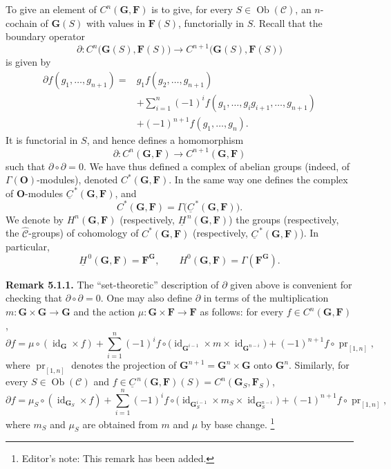 To give an element of \(C^n(\mathbf G,\mathbf F)\) is to give, for every
\(S\in\operatorname{Ob}(\mathscr C)\), an \(n\)-cochain of
\(\mathbf G(S)\) with values in \(\mathbf F(S)\), functorially in \(S\).
Recall that the boundary operator
\[
  \partial:C^n\bigl(\mathbf G(S),\mathbf F(S)\bigr)
    \longrightarrow
    C^{n+1}\bigl(\mathbf G(S),\mathbf F(S)\bigr)
\]
is given by
\begin{align*}
  \partial f(g_1,\ldots,g_{n+1})
    ={}&g_1f(g_2,\ldots,g_{n+1}) \\
     &+\sum_{i=1}^{n}(-1)^i
       f(g_1,\ldots,g_i g_{i+1},\ldots,g_{n+1}) \\
     &+(-1)^{n+1}f(g_1,\ldots,g_n).
\end{align*}
It is functorial in \(S\), and hence defines a homomorphism
\[
  \partial:C^n(\mathbf G,\mathbf F)
    \longrightarrow C^{n+1}(\mathbf G,\mathbf F)
\]
such that \(\partial\circ\partial=0\). We have thus defined a complex of
abelian groups (indeed, of \(\Gamma(\mathbf O)\)-modules), denoted
\(C^*(\mathbf G,\mathbf F)\). In the same way one defines the complex of
\(\mathbf O\)-modules \(\underline C^{\,*}(\mathbf G,\mathbf F)\), and
\[
  C^*(\mathbf G,\mathbf F)
    =\Gamma\bigl(\underline C^{\,*}(\mathbf G,\mathbf F)\bigr).
\]
We denote by \(H^n(\mathbf G,\mathbf F)\) (respectively,
\(\underline H^{\,n}(\mathbf G,\mathbf F)\)) the groups (respectively,
the \(\widehat{\mathscr C}\)-groups) of cohomology of
\(C^*(\mathbf G,\mathbf F)\) (respectively,
\(\underline C^{\,*}(\mathbf G,\mathbf F)\)). In particular,
\[
  \underline H^{\,0}(\mathbf G,\mathbf F)=\mathbf F^{\mathbf G},
  \qquad
  H^0(\mathbf G,\mathbf F)=\Gamma(\mathbf F^{\mathbf G}).
\]

\medskip
\noindent\textbf{Remark 5.1.1.}
The ``set-theoretic'' description of \(\partial\) given above is convenient
for checking that \(\partial\circ\partial=0\). One may also define
\(\partial\) in terms of the multiplication
\(m:\mathbf G\times\mathbf G\to\mathbf G\) and the action
\(\mu:\mathbf G\times\mathbf F\to\mathbf F\) as follows: for every
\(f\in C^n(\mathbf G,\mathbf F)\),
\[
  \partial f
    =\mu\circ(\operatorname{id}_{\mathbf G}\times f)
     +\sum_{i=1}^{n}(-1)^i
       f\circ
       \bigl(\operatorname{id}_{\mathbf G^{i-1}}\times m\times
             \operatorname{id}_{\mathbf G^{n-i}}\bigr)
     +(-1)^{n+1}f\circ\operatorname{pr}_{[1,n]},
\]
where \(\operatorname{pr}_{[1,n]}\) denotes the projection of
\(\mathbf G^{n+1}=\mathbf G^n\times\mathbf G\) onto \(\mathbf G^n\).
Similarly, for every \(S\in\operatorname{Ob}(\mathscr C)\) and
\(f\in\underline C^{\,n}(\mathbf G,\mathbf F)(S)
      =C^n(\mathbf G_S,\mathbf F_S)\),
\[
  \partial f
    =\mu_S\circ(\operatorname{id}_{\mathbf G_S}\times f)
     +\sum_{i=1}^{n}(-1)^i
       f\circ
       \bigl(\operatorname{id}_{\mathbf G_S^{i-1}}\times m_S\times
             \operatorname{id}_{\mathbf G_S^{n-i}}\bigr)
     +(-1)^{n+1}f\circ\operatorname{pr}_{[1,n]},
\]
where \(m_S\) and \(\mu_S\) are obtained from \(m\) and \(\mu\) by base
change.
\footnote{Editor's note: This remark has been added.}

